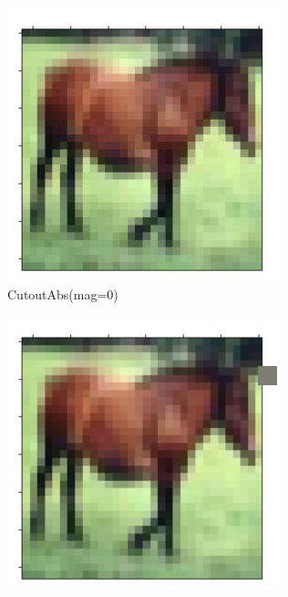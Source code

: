 \documentclass[onecolumn]{ujarticle}   %
\begin{document}
    \begin{figure}[h]
      \vspace{-4mm}
      \centering

      \begin{subfigure}{0.3\columnwidth}
        \centering
        \includegraphics[width=1.0\columnwidth]{transform_test/CutoutAbs_0.png}
        \caption{CutoutAbs(mag=0)}
        \label{fig:CutoutAbs_0}
      \end{subfigure}
      \begin{subfigure}{0.3\columnwidth}
        \centering
        \includegraphics[width=1.0\columnwidth]{transform_test/CutoutAbs_15.png}

\end{subfigure}
\end{figure}
\end{document}
